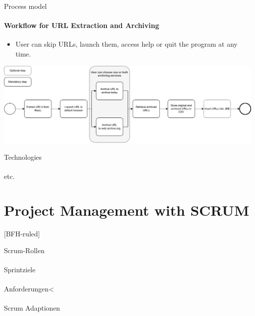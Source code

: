 \documentclass[
    ngerman,%
    authorontitle=true,
]{bfhbeamer}
\begin{document}
    \begin{frame}{Process model}
        \framesubtitle{Workflow for URL Extraction and Archiving}
        \begin{itemize}
            \item User can skip URLs, launch them, access help or quit the program at any time.
        \end{itemize}
        \vspace{0.8cm}
        \includegraphics[width=1\textwidth]{pictures/process_model-simple}
    \end{frame}

    \begin{frame}{Technologies}
        \framesubtitle{}
    \end{frame}

    \begin{frame}{etc.}
        \framesubtitle{}
    \end{frame}

    \section{Project Management with SCRUM}
    [BFH-ruled]
    \frame{\sectionpage}

    \begin{frame}{Scrum-Rollen}
        \framesubtitle{}
    \end{frame}

    \begin{frame}{Sprintziele}
        \framesubtitle{}
    \end{frame}

    \begin{frame}{Anforderungen}<
        \framesubtitle{}
    \end{frame}

    \begin{frame}{Scrum Adaptionen}
        \framesubtitle{}
    \end{frame}
\end{document}
